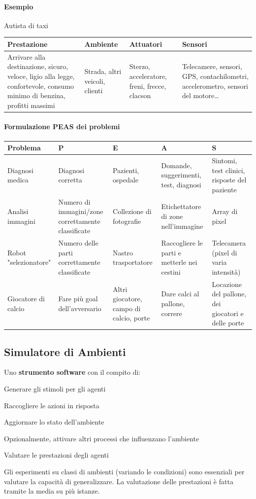 \documentclass[10pt]{book}
\begin{document}
\paragraph{Esempio} Autista di taxi
\begin{center}
	\begin{tabular}{p{4cm} | p{4cm} | p{4cm} | p{4cm}}
		\textbf{Prestazione} & \textbf{Ambiente} & \textbf{Attuatori} & \textbf{Sensori} \\
		\hline
		Arrivare alla destinazione, sicuro, veloce, ligio alla legge, confortevole, consumo minimo di benzina, profitti massimi & Strada, altri veicoli, clienti & Sterzo, acceleratore, freni, frecce, clacson & Telecamere, sensori, GPS, contachilometri, accelerometro, sensori del motore\ldots
	\end{tabular}
\end{center}
\paragraph{Formulazione PEAS dei problemi}
\begin{center}
	\begin{tabular}{p{3cm} | p{3cm} | p{3cm} | p{3cm} | p{3cm}}
		\textbf{Problema} & \textbf{P} & \textbf{E} & \textbf{A} & \textbf{S} \\
		\hline
		Diagnosi medica & Diagnosi corretta & Pazienti, ospedale & Domande, suggerimenti, test, diagnosi & Sintomi, test clinici, risposte del paziente \\
		\hline
		Analisi immagini & Numero di immagini/zone correttamente classificate & Collezione di fotografie & Etichettatore di zone nell'immagine & Array di pixel \\
		\hline
		Robot "selezionatore" & Numero delle parti correttamente classificate & Nastro trasportatore & Raccogliere le parti e metterle nei cestini & Telecamera (pixel di varia intensità) \\
		\hline
		Giocatore di calcio & Fare più goal dell'avversario & Altri giocatore, campo di calcio, porte & Dare calci al pallone, correre & Locazione del pallone, dei giocatori e delle porte
	\end{tabular}
\end{center}
\subsection{Simulatore di Ambienti}
Uno \textbf{strumento software} con il compito di:
\begin{list}{}{}
	\item Generare gli stimoli per gli agenti
	\item Raccogliere le azioni in risposta
	\item Aggiornare lo stato dell'ambiente
	\item Opzionalmente, attivare altri processi che influenzano l'ambiente
	\item Valutare le prestazioni degli agenti
\end{list}
Gli esperimenti su classi di ambienti (variando le condizioni) sono essenziali per valutare la capacità di generalizzare. La valutazione delle prestazioni è fatta tramite la media su più istanze.
\pagebreak
\end{document}
